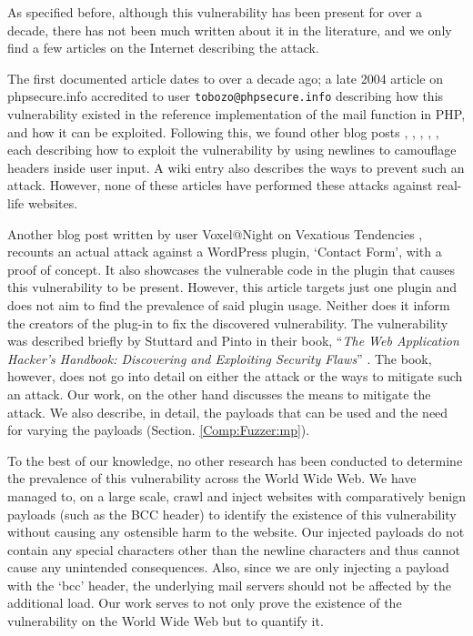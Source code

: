 As specified before, although this vulnerability has been present for over a decade, there has not been much written about it in the literature, and we only find a few articles on the Internet describing the attack.

The first documented article dates to over a decade ago; a late 2004 article on phpsecure.info \cite{Tobozo} accredited to user \lstinline|tobozo@phpsecure.info| describing how this vulnerability existed in the reference implementation of the mail function in PHP, and how it can be exploited. Following this, we found other blog posts \cite{Calin}, \cite{DK}, \cite{Injection2}, \cite{Nicol}, \cite{Pope}, each describing how to exploit the vulnerability by using newlines to camouflage headers inside user input. A wiki entry \cite{Injection} also describes the ways to prevent such an attack. However, none of these articles have performed these attacks against real-life websites.

Another blog post written by user Voxel@Night on Vexatious Tendencies \cite{Tendencies2014}, recounts an actual attack against a WordPress plugin, `Contact Form', with a proof of concept\footnotemark. It also showcases the vulnerable code in the plugin that causes this vulnerability to be present. However, this article targets just one plugin and does not aim to find the prevalence of said plugin usage. Neither does it inform the creators of the plug-in to fix the discovered vulnerability.
The vulnerability was described briefly by Stuttard and Pinto in their book, ``\emph{The Web Application Hacker's Handbook: Discovering and Exploiting Security Flaws}'' \cite{stuttard2011web}. The book, however, does not go into detail on either the attack or the ways to mitigate such an attack. Our work, on the other hand discusses the means to mitigate the attack. We also describe, in detail, the payloads that can be used and the need for varying the payloads (Section. \ref{Comp:Fuzzer:mp}).

To the best of our knowledge, no other research has been conducted to determine the prevalence of this vulnerability across the World Wide Web. We have managed to, on a large scale, crawl and inject websites with comparatively benign payloads (such as the BCC header) to identify the existence of this vulnerability without causing any ostensible harm to the website. Our injected payloads do not contain any special characters other than the newline characters and thus cannot cause any unintended consequences. Also, since we are only injecting a payload with the `bcc' header, the underlying mail servers should not be affected by the additional load. Our work serves to not only prove the existence of the vulnerability on the World Wide Web but to quantify it.
